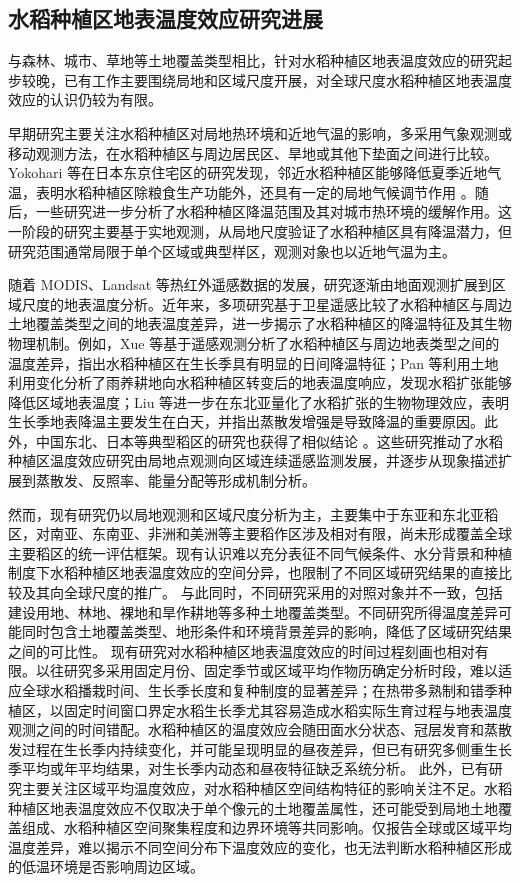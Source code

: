 \subsection{水稻种植区地表温度效应研究进展}
与森林、城市、草地等土地覆盖类型相比，针对水稻种植区地表温度效应的研究起步较晚，已有工作主要围绕局地和区域尺度开展，对全球尺度水稻种植区地表温度效应的认识仍较为有限。

早期研究主要关注水稻种植区对局地热环境和近地气温的影响，多采用气象观测或移动观测方法，在水稻种植区与周边居民区、旱地或其他下垫面之间进行比较。Yokohari 等在日本东京住宅区的研究发现，邻近水稻种植区能够降低夏季近地气温，表明水稻种植区除粮食生产功能外，还具有一定的局地气候调节作用 \cite{Yokohari2001}。随后，一些研究进一步分析了水稻种植区降温范围及其对城市热环境的缓解作用\cite{Tan2011,Ikawa2021}。这一阶段的研究主要基于实地观测，从局地尺度验证了水稻种植区具有降温潜力，但研究范围通常局限于单个区域或典型样区，观测对象也以近地气温为主。

随着 MODIS、Landsat 等热红外遥感数据的发展，研究逐渐由地面观测扩展到区域尺度的地表温度分析。近年来，多项研究基于卫星遥感比较了水稻种植区与周边土地覆盖类型之间的地表温度差异，进一步揭示了水稻种植区的降温特征及其生物物理机制。例如，Xue 等基于遥感观测分析了水稻种植区与周边地表类型之间的温度差异，指出水稻种植区在生长季具有明显的日间降温特征\cite{Xue2021RemoteSensing}；Pan 等利用土地利用变化分析了雨养耕地向水稻种植区转变后的地表温度响应，发现水稻扩张能够降低区域地表温度\cite{Pan2020STOTEN}；Liu 等进一步在东北亚量化了水稻扩张的生物物理效应，表明生长季地表降温主要发生在白天，并指出蒸散发增强是导致降温的重要原因\cite{Liu2022AgForMet}。此外，中国东北、日本等典型稻区的研究也获得了相似结论 \cite{Liu2019ScientificReports,Du2019,Xin2022RemoteSensing}。这些研究推动了水稻种植区温度效应研究由局地点观测向区域连续遥感监测发展，并逐步从现象描述扩展到蒸散发、反照率、能量分配等形成机制分析。

然而，现有研究仍以局地观测和区域尺度分析为主，主要集中于东亚和东北亚稻区，对南亚、东南亚、非洲和美洲等主要稻作区涉及相对有限，尚未形成覆盖全球主要稻区的统一评估框架。现有认识难以充分表征不同气候条件、水分背景和种植制度下水稻种植区地表温度效应的空间分异，也限制了不同区域研究结果的直接比较及其向全球尺度的推广。
与此同时，不同研究采用的对照对象并不一致，包括建设用地、林地、裸地和旱作耕地等多种土地覆盖类型。不同研究所得温度差异可能同时包含土地覆盖类型、地形条件和环境背景差异的影响，降低了区域研究结果之间的可比性。
现有研究对水稻种植区地表温度效应的时间过程刻画也相对有限。以往研究多采用固定月份、固定季节或区域平均作物历确定分析时段，难以适应全球水稻播栽时间、生长季长度和复种制度的显著差异；在热带多熟制和错季种植区，以固定时间窗口界定水稻生长季尤其容易造成水稻实际生育过程与地表温度观测之间的时间错配。水稻种植区的温度效应会随田面水分状态、冠层发育和蒸散发过程在生长季内持续变化，并可能呈现明显的昼夜差异，但已有研究多侧重生长季平均或年平均结果，对生长季内动态和昼夜特征缺乏系统分析。
此外，已有研究主要关注区域平均温度效应，对水稻种植区空间结构特征的影响关注不足。水稻种植区地表温度效应不仅取决于单个像元的土地覆盖属性，还可能受到局地土地覆盖组成、水稻种植区空间聚集程度和边界环境等共同影响。仅报告全球或区域平均温度差异，难以揭示不同空间分布下温度效应的变化，也无法判断水稻种植区形成的低温环境是否影响周边区域。

